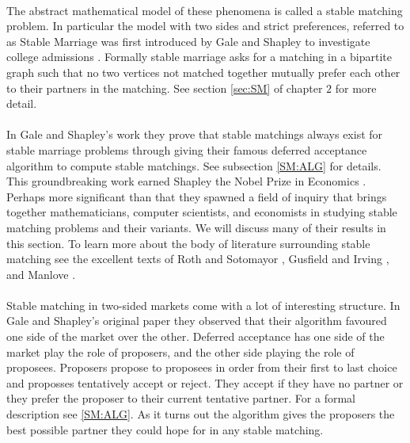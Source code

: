 \paragraph{}
The abstract mathematical model of these phenomena is called a stable matching problem. In particular the model with two sides and strict preferences, referred to as Stable Marriage was first introduced by Gale and Shapley to investigate college admissions \cite{gale1962college}. Formally stable marriage asks for a matching in a bipartite graph such that no two vertices not matched together mutually prefer each other to their partners in the matching. See section \ref{sec:SM} of chapter $2$ for more detail. 

\paragraph{}
In Gale and Shapley's work they prove that stable matchings always exist for stable marriage problems through giving their famous deferred acceptance algorithm to compute stable matchings. See subsection \ref{SM:ALG} for details. This groundbreaking work earned Shapley the Nobel Prize in Economics \cite{economic2012stable}. Perhaps more significant than that they spawned a field of inquiry that brings together mathematicians, computer scientists, and economists in studying stable matching problems and their variants. We will discuss many of their results in this section. To learn more about the body of literature surrounding stable matching see the excellent texts of Roth and Sotomayor \cite{roth1992two}, Gusfield and Irving \cite{gusfield1989stable}, and Manlove \cite{manlove2013algorithmics}.
\paragraph{}
Stable matching in two-sided markets come with a lot of interesting structure. In Gale and Shapley's original paper \cite{gale1962college} they observed that their algorithm favoured one side of the market over the other. Deferred acceptance has one side of the market play the role of proposers, and the other side playing the role of proposees. Proposers propose to proposees in order from their first to last choice and proposses tentatively accept or reject. They accept if they have no partner or they prefer the proposer to their current tentative partner. For a formal description see \ref{SM:ALG}. As it turns out the algorithm gives the proposers the best possible partner they could hope for in any stable matching. 
